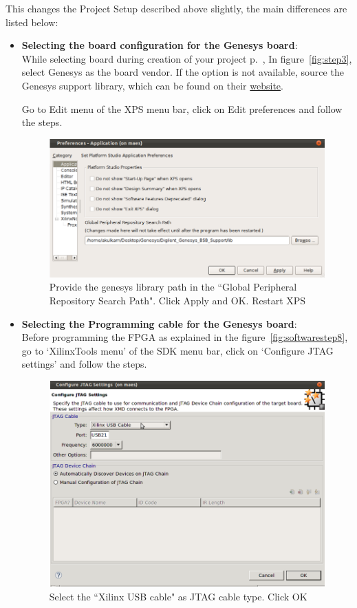 \documentclass[a4paper,oneside]{memoir}
\begin{document}
This changes the Project Setup described above slightly, the main differences are listed below:
\begin{itemize}
\item \textbf{Selecting the board configuration for the Genesys board}: \\
While selecting board during creation of your project p.\ \pageref{sec:creating_proj_blaze}, In figure~\ref{fig:step3}, select Genesys as the board vendor. If the option is not available, source the Genesys support library, which can be found on their \href{http://www.digilentinc.com/Products/Detail.cfm?Prod=GENESYS}{website}.

Go to Edit menu of the XPS menu bar, click on Edit preferences and follow the steps.
\begin{figure}[H]
\centering
\includegraphics[scale=0.5]{genesys_diff1}
\caption{Provide the genesys library path in the ``Global Peripheral Repository Search Path".  Click Apply and OK. Restart XPS\label{fig:genesys_diff1}}
\end{figure}

\item \textbf{Selecting the Programming cable for the Genesys board}: \\
Before programming the FPGA as explained in the figure~\ref{fig:softwarestep8}, go to `XilinxTools menu' of the SDK menu bar, click on `Configure JTAG settings' and follow the steps.

\begin{figure}[H]
\centering
\includegraphics[scale=0.5]{genesys_diff2}
\caption{Select the ``Xilinx USB cable" as JTAG cable type. Click OK\label{fig:genesys_diff2}}
\end{figure}


\end{itemize}
\end{document}
